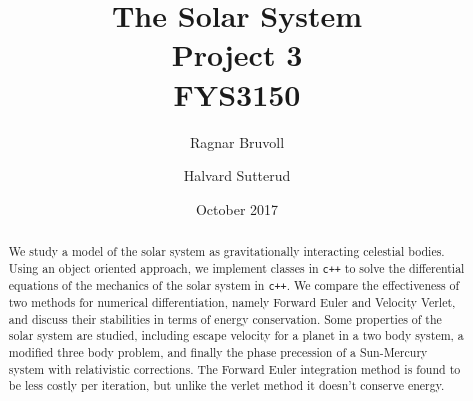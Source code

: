 \documentclass[10pt]{article}
\begin{document}
\title{The Solar System
\\ Project 3
\\ FYS3150}
\author{Ragnar Bruvoll \and Halvard Sutterud}
\date{October 2017}
\maketitle{\begin{center}\end{center}}
\thispagestyle{empty}

\begin{abstract}
    We study a model of the solar system as gravitationally interacting
    celestial bodies.  Using an object oriented approach, we implement
    classes in \texttt{c++} to solve the differential equations of the
    mechanics of the solar system in \texttt{c++}. We compare the effectiveness of
    two methods for numerical differentiation, namely Forward Euler and
    Velocity Verlet, and discuss their stabilities in terms of energy
    conservation. Some properties of the solar system are studied, including
    escape velocity for a planet in a two body system, a modified three
    body problem, and finally the phase precession of a Sun-Mercury system
    with relativistic corrections. 
    The Forward Euler integration method is found to be less costly per
    iteration, but unlike the verlet method it doesn't conserve energy. 
     
\end{abstract}
\end{document}
